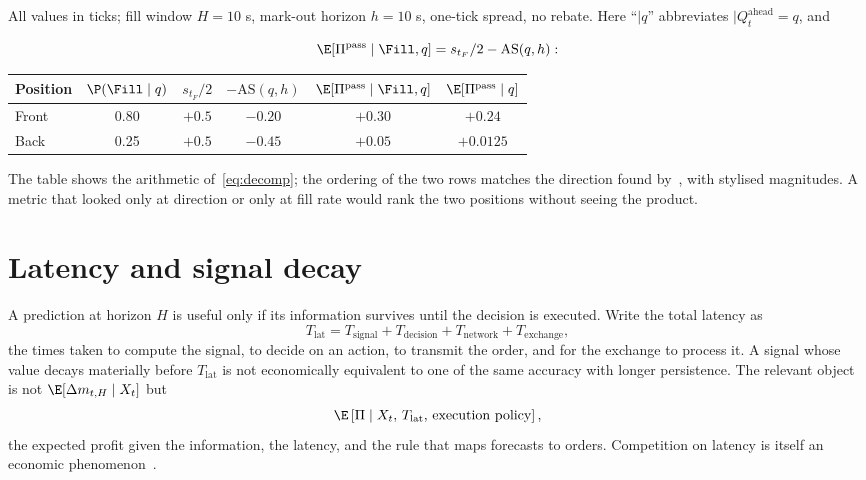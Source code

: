 \begin{example}
\label{ex:as}
All values in ticks; fill window $H = 10$ s, mark-out horizon $h = 10$ s, one-tick spread, no
rebate. Here ``$\mid q$'' abbreviates $\mid Q^{\text{ahead}}_t = q$, and

\[
  \E[\Pi^{\text{pass}} \mid \Fill, q] = s_{t_F}/2 - \mathrm{AS}(q,h):
\]

\begin{center}\small
\begin{tabular}{lccccc}
\toprule
Position & $\P(\Fill \mid q)$ & $s_{t_F}/2$ & $-\mathrm{AS}(q,h)$ & $\E[\Pi^{\text{pass}} \mid \Fill, q]$ & $\E[\Pi^{\text{pass}} \mid q]$ \\
\midrule
Front & 0.80 & $+0.5$ & $-0.20$ & $+0.30$ & $+0.24$ \\
Back  & 0.25 & $+0.5$ & $-0.45$ & $+0.05$ & $+0.0125$ \\
\bottomrule
\end{tabular}
\end{center}
The table shows the arithmetic of~\eqref{eq:decomp}; the ordering of the two rows matches the
direction found by~\citet{moallemi2017}, with stylised magnitudes. A metric that looked
only at direction or only at fill rate would rank the two positions without seeing the product.
\end{example}

\section{Latency and signal decay}
\label{sec:latency}

A prediction at horizon $H$ is useful only if its information survives until the decision is
executed. Write the total latency as
\begin{equation}
  T_{\text{lat}} = T_{\text{signal}} + T_{\text{decision}} + T_{\text{network}} + T_{\text{exchange}},
\end{equation}
the times taken to compute the signal, to decide on an action, to transmit the order, and for the
exchange to process it.
A signal whose value decays materially before $T_{\text{lat}}$ is not economically equivalent to
one of the same accuracy with longer persistence. The relevant object is not
$\E[\Delta m_{t,H} \mid X_t]$ but
\begin{equation}
  \E\left[\Pi \mid X_t,\, T_{\text{lat}},\, \text{execution policy}\right],
\end{equation}
the expected profit given the information, the latency, and the rule that maps forecasts to orders.
Competition on latency is itself an economic phenomenon~\citep{budish2015,hasbrouck2013}.

